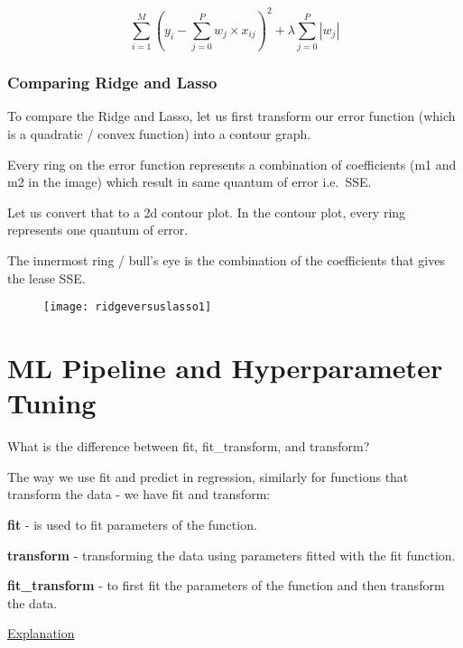 	\begin{equation}
		\sum^M_{i=1} \left(y_i - \sum^P_{j=0} w_j \times x_{ij} \right)^2  +  \lambda \sum^P_{j=0} \left| w_j \right|
	\end{equation}

	\subsection{Comparing Ridge and Lasso}
To compare the Ridge and Lasso, let us first transform our error function (which is a quadratic / convex function) into a contour graph.

	\begin{bulletedlist}
		\item Every ring on the error function represents a combination of coefficients (m1 and m2 in the image) which result in same quantum of error i.e.\ SSE.
		\item Let us convert that to a 2d contour plot.  In the contour plot, every ring represents one quantum of error.
		\item The innermost ring / bull's eye is the combination of the coefficients that gives the lease SSE.
	\end{bulletedlist}

	\begin{figure}[tbh]
		\centering
		\texttt{[image: ridgeversuslasso1]}
		\caption{}
		\label{fig:ridgeversuslasso1}
	\end{figure}


	\chapter{ML Pipeline and Hyperparameter Tuning}


	\resetquestioncounter{}
	\begin{qanda}
		\begin{question}
What is the difference between fit, fit\_transform, and transform?
		\end{question}

		\begin{answer}
The way we use fit and predict in regression, similarly for functions that transform the data - we have fit and transform:

\textbf{fit} - is used to fit parameters of the function.

\textbf{transform} - transforming the data using parameters fitted with the fit function.

\textbf{fit\_transform} - to first fit the parameters of the function and then transform the data.

\href{https://towardsdatascience.com/what-and-why-behind-fit-transform-vs-transform-in-scikit-learn-78f915cf96fe}{Explanation}
		\end{answer}
	\end{qanda}

